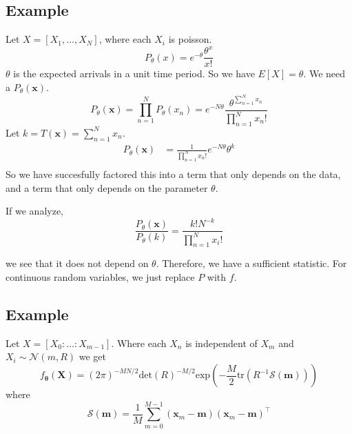 \documentclass[a4paper]{article}
\begin{document}
\subsection*{Example}%
Let $X = [X_1, \dots, X_N]$, where each $X_i$ is poisson.
\[
  P_{\theta}(x) = e^{-\theta} \frac{\theta^x}{x!}
\]
$\theta$ is the expected arrivals in a unit time period. So we have $E[X] = \theta$. We need a $P_{\theta}(\mathbf{x})$.
\[
  P_{\theta}(\mathbf{x}) = \prod_{n=1}^N P_{\theta}(x_n) = e^{-N\theta}  \frac{\theta^{\sum_{n=1}^N x_n}}{\prod_{n=1}^N x_n!}
\]
Let $k = T(\mathbf{x}) = \sum_{n=1}^N x_n$. 
\[
  \begin{aligned}
    P_{\theta}(\mathbf{x}) &= \frac{1}{\prod_{n=1}^N x_n!} e^{-N \theta} \theta^k \\
  \end{aligned}
\]
So we have succesfully factored this into a term that only depends on the data, and a term that only depends on the parameter $\theta$.

If we analyze, 
\[
  \frac{P_{\theta}(\mathbf{x})}{P_{\theta}(k)} = \frac{k! N^{-k}}{\prod_{n=1}^N x_i!}
\]

we see that it does not depend on $\theta$. Therefore, we have a sufficient statistic. For continuous random variables, we just replace $P$ with $f$.

\subsection*{Example}%
Let $X = [X_0: \dots: X_{m-1}]$. Where each $X_n$ is independent of $X_m$ and $X_i \sim \mathcal{N}(m, R)$
we get
\[
  f_{\bm{\theta}}(\mathbf{X}) = 
  (2\pi)^{-MN/2} \text{det}(R)^{-M/2} \text{exp} \left( -\frac{M}{2} \text{tr} \left( R^{-1} \mathcal{S}(\mathbf{m}) \right)\right)
\]
where 
\[
  \mathcal{S}(\mathbf{m}) = \frac{1}{M} \sum_{m=0}^{M-1} (\mathbf{x}_m  - \mathbf{m})(\mathbf{x}_m - \mathbf{m})^\top
\]
\label{sub:Example}
\end{document}
